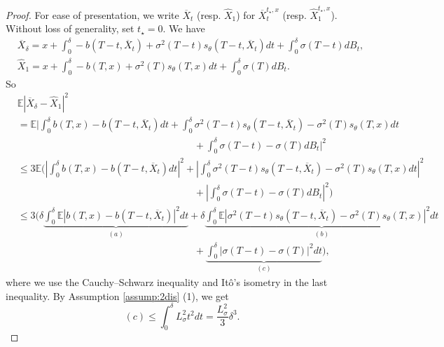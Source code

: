 \documentclass[letterpaper,10pt,reqno]{amsart}
\numberwithin{equation}{section}
\begin{document}
\begin{proof}
For ease of presentation, 
we write $\overline{X}_{t}$ (resp. $\widehat{X}_1$) 
for $\overline{X}^{t_\star, x}_t$ (resp. $\widehat{X}^{t_\star, x}_1$).
Without loss of generality, set $t_\star = 0$.
We have
\begin{equation*}
\begin{aligned}
& \overline{X}_\delta = x + \int_0^\delta -b(T-t, \overline{X}_t) + \sigma^2(T-t) s_\theta(T-t, \overline{X}_t) dt + \int_0^\delta \sigma(T-t) dB_t, \\
& \widehat{X}_1 = x + \int_0^\delta -b(T,x) + \sigma^2(T) s_\theta(T,x) dt
+ \int_0^\delta \sigma(T) dB_t.
\end{aligned}
\end{equation*}
So
\begin{equation}
\label{eq:diffthree}
\begin{aligned}
& \mathbb{E}|\overline{X}_\delta -\widehat{X}_1|^2  \\
& = \mathbb{E} \bigg|\int_0^\delta b(T,x) - b(T-t, \overline{X}_t) dt + 
\int_0^\delta \sigma^2(T-t) s_\theta(T-t, \overline{X}_t) -\sigma^2(T) s_\theta(T,x) dt  \\
& \qquad \qquad \qquad \qquad \qquad \qquad \qquad \qquad \qquad + \int_0^\delta \sigma (T-t) - \sigma(T) dB_t \bigg|^2 \\
&\le 3 \mathbb{E} \bigg( \left|\int_0^\delta b(T,x) - b(T-t, \overline{X}_t) dt\right|^2
+ \left| \int_0^\delta \sigma^2(T-t) s_\theta(T-t, \overline{X}_t) -\sigma^2(T) s_\theta(T,x) dt\right|^2 \\
&  \qquad \qquad \qquad \qquad \qquad \qquad \qquad \qquad \qquad +
\left| \int_0^\delta \sigma (T-t) - \sigma(T) dB_t \right|^2 \bigg) \\
& \le 3 \bigg(\delta  \underbrace{\int_0^\delta \mathbb{E} |b(T,x) - b(T-t, \overline{X}_t)|^2 dt}_{(a)} + \delta \underbrace{\int_0^\delta \mathbb{E} |\sigma^2(T-t) s_\theta(T-t, \overline{X}_t) -\sigma^2(T) s_\theta(T,x)|^2 dt}_{(b)} \\
& \qquad \qquad \qquad \qquad \qquad \qquad \qquad \qquad \qquad +
\underbrace{\int_0^\delta |\sigma(T-t) - \sigma(T)|^2 dt}_{(c)} \bigg),
\end{aligned}
\end{equation}
where we use the Cauchy–Schwarz inequality and It\^o's isometry in the last inequality. 
By Assumption \ref{assump:2dis} (1), we get
\begin{equation}
\label{eq:diffthreec}
(c) \le \int_0^\delta L_\sigma^2 t^2 dt = \frac{L_\sigma^2}{3} \delta^3.

\end{equation}
\end{proof}
\end{document}
